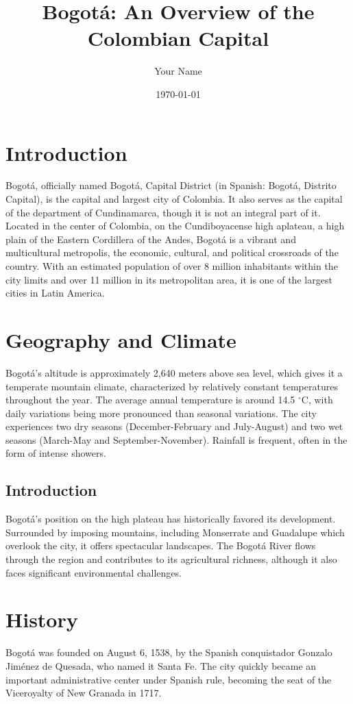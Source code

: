 \documentclass{article}
\title{Bogotá: An Overview of the Colombian Capital}
\author{Your Name}
\date{\today}
\begin{document}
\maketitle

\section{Introduction}
Bogotá, officially named Bogotá, Capital District (in Spanish: Bogotá, Distrito Capital), is the capital and largest city of Colombia. It also serves as the capital of the department of Cundinamarca, though it is not an integral part of it. Located in the center of Colombia, on the Cundiboyacense high aplateau, a high plain of the Eastern Cordillera of the Andes, Bogotá is a vibrant and multicultural metropolis, the economic, cultural, and political crossroads of the country. With an estimated population of over 8 million inhabitants within the city limits and over 11 million in its metropolitan area, it is one of the largest cities in Latin America.

\section{Geography and Climate}
Bogotá's altitude is approximately 2,640 meters above sea level, which gives it a temperate mountain climate, characterized by relatively constant temperatures throughout the year. The average annual temperature is around 14.5 $^\circ$C, with daily variations being more pronounced than seasonal variations. The city experiences two dry seasons (December-February and July-August) and two wet seasons (March-May and September-November). Rainfall is frequent, often in the form of intense showers.

\subsection{Introduction}
Bogotá's position on the high plateau has historically favored its development. Surrounded by imposing mountains, including Monserrate and Guadalupe which overlook the city, it offers spectacular landscapes. The Bogotá River flows through the region and contributes to its agricultural richness, although it also faces significant environmental challenges.

\section{History}
Bogotá was founded on August 6, 1538, by the Spanish conquistador Gonzalo Jiménez de Quesada, who named it Santa Fe. The city quickly became an important administrative center under Spanish rule, becoming the seat of the Viceroyalty of New Granada in 1717.
\end{document}

